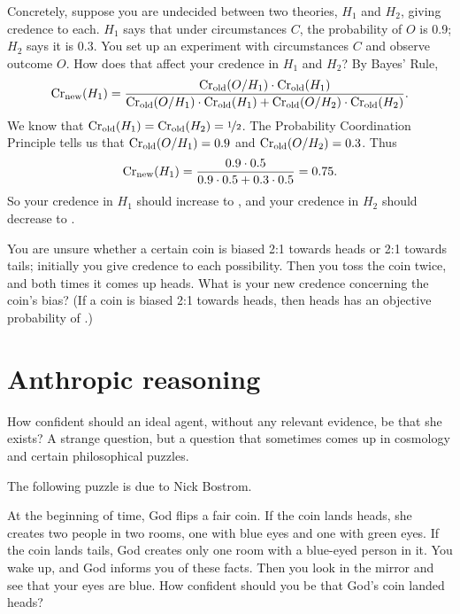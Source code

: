 Concretely, suppose you are undecided between two theories, $H_1$ and
$H_2$, giving credence  to each. $H_1$ says that under
circumstances $C$, the probability of $O$ is 0.9; $H_2$ says it is
0.3. You set up an experiment with circumstances $C$ and observe
outcome $O$. How does that affect your credence in $H_1$ and $H_2$? By
Bayes' Rule,
\[
\text{Cr}_{\text{new}}(H_1) = \frac{\text{Cr}_{\text{old}}(O/H_1) \cdot
  \text{Cr}_{\text{old}}(H_1)}{\text{Cr}_\text{old}(O/H_1)\cdot \text{Cr}_\text{old}(H_1) +
  \text{Cr}_\text{old}(O/H_2)\cdot \text{Cr}_\text{old}(H_2)}.
\]
We know that $\text{Cr}_\text{old}(H_1) = \text{Cr}_\text{old}(H_2) =
\nicefrac{1}{2}$. The Probability Coordination Principle tells us that
$\text{Cr}_{\text{old}}(O/H_1) = 0.9$ and $\text{Cr}_{\text{old}}(O/H_2) = 0.3$. Thus 
\[
\text{Cr}_{\text{new}}(H_1) = \frac{0.9 \cdot 0.5}{0.9 \cdot 0.5 + 0.3 \cdot 0.5} = 0.75.
\]
So your credence in $H_1$ should increase to , and your
credence in $H_2$ should decrease to .



\begin{exercise2}
  You are unsure whether a certain coin is biased 2:1 towards heads or
  2:1 towards tails; initially you give credence  to
  each possibility. Then you toss the coin twice, and both times it
  comes up heads. What is your new credence concerning the coin's
  bias? (If a coin is biased 2:1 towards heads, then heads has an
  objective probability of .) 
\end{exercise2}



\section{Anthropic reasoning}

How confident should an ideal agent, without any relevant evidence, be
that she exists? A strange question, but a question that sometimes comes
up in cosmology and certain philosophical puzzles. 

The following puzzle is due to Nick Bostrom.

\begin{example}\label{ex:godscoin}
  At the beginning of time, God flips a fair coin. If the coin lands
  heads, she creates two people in two rooms, one with blue eyes and
  one with green eyes. If the coin lands tails, God creates only one
  room with a blue-eyed person in it. You wake up, and God informs you
  of these facts. Then you look in the mirror and see that your eyes
  are blue. How confident should you be that God's coin landed heads?
\end{example}

